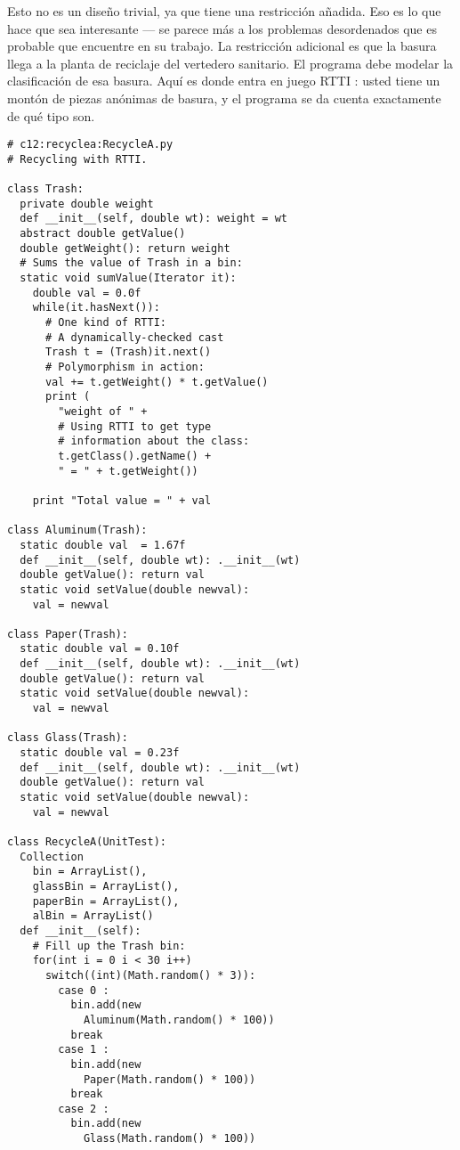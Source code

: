 Esto no es un diseño trivial, ya que tiene una restricción añadida. Eso es lo que hace que sea interesante — se parece más a los problemas desordenados que es probable que encuentre en su trabajo. La restricción adicional es que la basura llega a la planta de reciclaje del vertedero sanitario. El programa debe modelar la clasificación de esa basura. Aquí es donde entra en juego RTTI : usted tiene un montón de piezas anónimas de basura, y el programa se da cuenta exactamente de qué tipo son.  \newline


\begin{lstlisting} 
# c12:recyclea:RecycleA.py  
# Recycling with RTTI. 

class Trash: 
  private double weight 
  def __init__(self, double wt): weight = wt  
  abstract double getValue() 
  double getWeight(): return weight  
  # Sums the value of Trash in a bin: 
  static void sumValue(Iterator it): 
    double val = 0.0f 
    while(it.hasNext()): 
      # One kind of RTTI: 
      # A dynamically-checked cast 
      Trash t = (Trash)it.next() 
      # Polymorphism in action: 
      val += t.getWeight() * t.getValue() 
      print ( 
        "weight of " + 
        # Using RTTI to get type 
        # information about the class: 
        t.getClass().getName() + 
        " = " + t.getWeight()) 
        
    print "Total value = " + val 
    
class Aluminum(Trash): 
  static double val  = 1.67f 
  def __init__(self, double wt): .__init__(wt)  
  double getValue(): return val  
  static void setValue(double newval): 
    val = newval 
    
class Paper(Trash): 
  static double val = 0.10f 
  def __init__(self, double wt): .__init__(wt)  
  double getValue(): return val  
  static void setValue(double newval): 
    val = newval 
    
class Glass(Trash): 
  static double val = 0.23f 
  def __init__(self, double wt): .__init__(wt)  
  double getValue(): return val  
  static void setValue(double newval): 
    val = newval 
    
class RecycleA(UnitTest): 
  Collection  
    bin = ArrayList(), 
    glassBin = ArrayList(), 
    paperBin = ArrayList(), 
    alBin = ArrayList() 
  def __init__(self): 
    # Fill up the Trash bin: 
    for(int i = 0 i < 30 i++) 
      switch((int)(Math.random() * 3)): 
        case 0 : 
          bin.add(new 
            Aluminum(Math.random() * 100)) 
          break 
        case 1 : 
          bin.add(new 
            Paper(Math.random() * 100)) 
          break 
        case 2 : 
          bin.add(new 
            Glass(Math.random() * 100)) 
            

\end{lstlisting}
